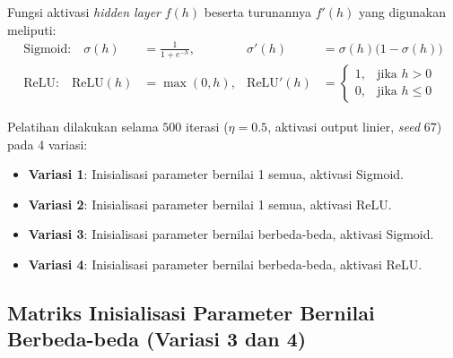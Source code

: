 \documentclass[11pt,a4paper]{article}
\theoremstyle{plain}
\theoremstyle{definition}
\theoremstyle{remark}
\begin{document}
\noindent Fungsi aktivasi \textit{hidden layer} $f(h)$ beserta turunannya $f'(h)$ yang digunakan meliputi:
\begin{align}
    \text{Sigmoid:} \quad \sigma(h) &= \frac{1}{1 + e^{-h}}, & \sigma'(h) &= \sigma(h)\bigl(1 - \sigma(h)\bigr) \label{eq:def_sigmoid} \\[0.2em]
    \text{ReLU:} \quad \text{ReLU}(h) &= \max(0, h), & \text{ReLU}'(h) &= \begin{cases} 1, & \text{jika } h > 0 \\ 0, & \text{jika } h \le 0 \end{cases} \label{eq:def_relu}
\end{align}

\noindent Pelatihan dilakukan selama $500$ iterasi ($\eta = 0.5$, aktivasi output linier, \textit{seed} $67$) pada 4 variasi:
\begin{itemize}
    \item \textbf{Variasi 1}: Inisialisasi parameter bernilai 1 semua, aktivasi Sigmoid.
    \item \textbf{Variasi 2}: Inisialisasi parameter bernilai 1 semua, aktivasi ReLU.
    \item \textbf{Variasi 3}: Inisialisasi parameter bernilai berbeda-beda, aktivasi Sigmoid.
    \item \textbf{Variasi 4}: Inisialisasi parameter bernilai berbeda-beda, aktivasi ReLU.
\end{itemize}

\subsection{Matriks Inisialisasi Parameter Bernilai Berbeda-beda (Variasi 3 dan 4)}
\label{subsec:init_berbeda}
\end{document}
